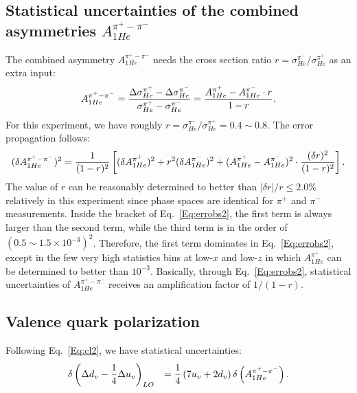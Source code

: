 \subsection{Statistical uncertainties of the combined asymmetries  $A_{1He}^{\pi^+ - \pi^-}$ }
The combined asymmetry $A_{1He}^{\pi^+ - \pi^-}$ needs the 
 cross section ratio $r=\sigma_{He}^{\pi^-}/\sigma_{He}^{\pi^+}$ as an extra input:
\begin{equation}
\label{Eq:obs2}
A_{1He}^{\pi^+ - \pi^-}  =  { \Delta \sigma_{He}^{\pi^+} -\Delta \sigma_{He}^{\pi^-} \over
\sigma_{He}^{\pi^+} - \sigma_{He}^{\pi^-} }=
{ A_{1He}^{\pi^+} -  A_{1He}^{\pi^-} \cdot r
\over 1 - r }.
\end{equation}
For this experiment, we have roughly $r=\sigma^{\pi^-}_{He}/\sigma^{\pi^+}_{He}=0.4 \sim 0.8$. 
The error propagation follows:
\begin{equation}
\label{Eq:errobs2}
(\delta A_{1He}^{\pi^+ - \pi^-})^2  = {1 \over (1 - r)^2} \left[ (\delta  A_{1He}^{\pi^+} )^2 + 
r^2 (\delta  A_{1He}^{\pi^-} )^2
+(A_{1He}^{\pi^+} - A_{1He}^{\pi^-} )^2   \cdot {(\delta r)^2  \over (1 - r)^2}  \right].
\end{equation}
The value of $r$ can be reasonably determined to better than 
 $|\delta r|/r \le 2.0 \%$  relatively in this experiment since phase spaces are identical for $\pi^+$ and 
$\pi^-$ measurements.  
 Inside the bracket of Eq.~\ref{Eq:errobs2}, the first term is always larger than the second term, while the third term is in the order of $(0.5\sim 1.5 \times10^{-3})^2$. 
Therefore, the first term dominates in Eq.~\ref{Eq:errobs2}, except in the few very high statistics bins at low-$x$ and low-$z$ in which  $A_{1He}^{\pi^+}$ can be  determined to better than $10^{-3}$. Basically, through Eq.~\ref{Eq:errobs2}, statistical uncertainties of $A_{1He}^{\pi^+ - \pi^-}$ receives an amplification factor  of $1/(1-r)$.

\subsection{Valence quark polarization}
Following Eq.~\ref{Eq:cl2},  we have  statistical uncertainties:
\begin{eqnarray}
\label{Eq:errcl2}
& \delta \left( \Delta d_v-{1 \over 4} \Delta u_v  \right)_{LO} &  = {1 \over 4} \left( 7 u_v + 2 d_v \right)  \delta \left(A_{1He}^{\pi^+ - \pi^-} \right).
\end{eqnarray}

